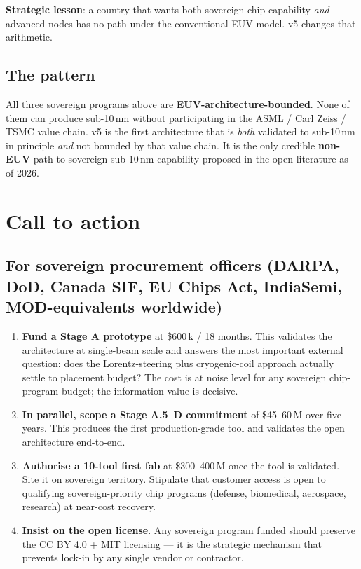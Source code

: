 \documentclass[11pt,letterpaper]{article}
\begin{document}
\textbf{Strategic lesson}: a country that wants both sovereign chip capability \textit{and} advanced nodes has no path under the conventional EUV model. v5 changes that arithmetic.

\subsection{The pattern}

All three sovereign programs above are \textbf{EUV-architecture-bounded}. None of them can produce sub-10\,nm without participating in the ASML / Carl Zeiss / TSMC value chain. v5 is the first architecture that is \textit{both} validated to sub-10\,nm in principle \textit{and} not bounded by that value chain. It is the only credible \textbf{non-EUV} path to sovereign sub-10\,nm capability proposed in the open literature as of 2026.

\section{Call to action}

\subsection{For sovereign procurement officers (DARPA, DoD, Canada SIF, EU Chips Act, IndiaSemi, MOD-equivalents worldwide)}

\begin{enumerate}[leftmargin=1.6em]
  \item \textbf{Fund a Stage A prototype} at \$600\,k / 18 months. This validates the architecture at single-beam scale and answers the most important external question: does the Lorentz-steering plus cryogenic-coil approach actually settle to placement budget? The cost is at noise level for any sovereign chip-program budget; the information value is decisive.
  \item \textbf{In parallel, scope a Stage A.5--D commitment} of \$45--60\,M over five years. This produces the first production-grade tool and validates the open architecture end-to-end.
  \item \textbf{Authorise a 10-tool first fab} at \$300--400\,M once the tool is validated. Site it on sovereign territory. Stipulate that customer access is open to qualifying sovereign-priority chip programs (defense, biomedical, aerospace, research) at near-cost recovery.
  \item \textbf{Insist on the open license}. Any sovereign program funded should preserve the CC BY 4.0 + MIT licensing --- it is the strategic mechanism that prevents lock-in by any single vendor or contractor.
\end{enumerate}
\end{document}
